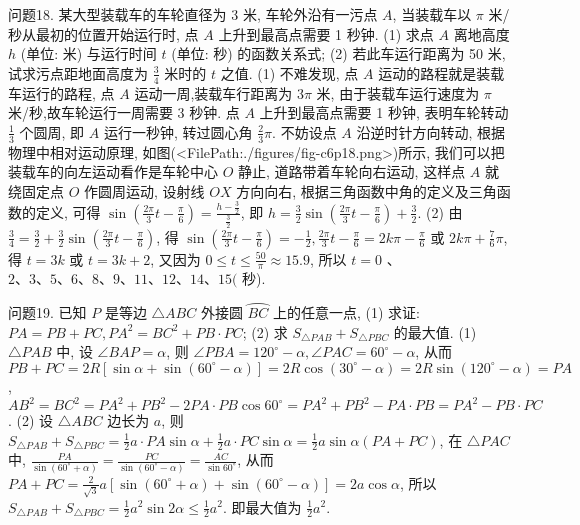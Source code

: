 问题18. 某大型装载车的车轮直径为 3 米, 车轮外沿有一污点 $A$, 当装载车以 $\pi$ 米/秒从最初的位置开始运行时, 点 $A$ 上升到最高点需要 1 秒钟.
(1) 求点 $A$ 离地高度 $h$ (单位: 米) 与运行时间 $t$ (单位: 秒) 的函数关系式; (2) 若此车运行距离为 50 米, 试求污点距地面高度为 $\frac{3}{4}$ 米时的 $t$ 之值.
(1) 不难发现, 点 $A$ 运动的路程就是装载车运行的路程, 点 $A$ 运动一周,装载车行距离为 $3 \pi$ 米, 由于装载车运行速度为 $\pi$ 米/秒,故车轮运行一周需要 3 秒钟.
点 $A$ 上升到最高点需要 1 秒钟, 表明车轮转动 $\frac{1}{3}$ 个圆周, 即 $A$ 运行一秒钟, 转过圆心角 $\frac{2}{3} \pi$. 不妨设点 $A$ 沿逆时针方向转动, 根据物理中相对运动原理, 如图(<FilePath:./figures/fig-c6p18.png>)所示, 我们可以把装载车的向左运动看作是车轮中心 $O$ 静止, 道路带着车轮向右运动, 这样点 $A$ 就绕固定点 $O$ 作圆周运动, 设射线 $O X$ 方向向右, 根据三角函数中角的定义及三角函数的定义, 可得 $\sin \left(\frac{2 \pi}{3} t-\frac{\pi}{6}\right)=\frac{h-\frac{3}{2}}{\frac{3}{2}}$, 即 $h=\frac{3}{2} \sin \left(\frac{2 \pi}{3} t-\frac{\pi}{6}\right)+\frac{3}{2}$.
(2) 由 $\frac{3}{4}=\frac{3}{2}+\frac{3}{2} \sin \left(\frac{2 \pi}{3} t-\frac{\pi}{6}\right)$, 得 $\sin \left(\frac{2 \pi}{3} t-\frac{\pi}{6}\right)=-\frac{1}{2}, \frac{2 \pi}{3} t-\frac{\pi}{6}=2 k \pi- \frac{\pi}{6}$ 或 $2 k \pi+\frac{7}{6} \pi$, 得 $t=3 k$ 或 $t=3 k+2$, 又因为 $0 \leqslant t \leqslant \frac{50}{\pi} \approx 15.9$, 所以 $t=0$ 、 $2 、 3 、 5 、 6 、 8 、 9 、 11 、 12 、 14 、 15($ 秒).



问题19. 已知 $P$ 是等边 $\triangle A B C$ 外接圆 $\overparen{B C}$ 上的任意一点,
(1) 求证: $P A=P B+P C, P A^2=B C^2+P B \cdot P C$;
(2) 求 $S_{\triangle P A B}+S_{\triangle P B C}$ 的最大值.
(1) $\triangle P A B$ 中, 设 $\angle B A P=\alpha$, 则 $\angle P B A= 120^{\circ}-\alpha, \angle P A C=60^{\circ}-\alpha$, 从而 $P B+P C=2 R\left[\sin \alpha+ \sin \left(60^{\circ}-\alpha\right)\right]=2 R \cos \left(30^{\circ}-\alpha\right)=2 R \sin \left(120^{\circ}-\alpha\right)=P A$, $A B^2=B C^2=P A^2+P B^2-2 P A \cdot P B \cos 60^{\circ}=P A^2+ P B^2-P A \cdot P B=P A^2-P B \cdot P C$. 
(2) 设 $\triangle A B C$ 边长为 $a$, 则 $S_{\triangle P A B}+S_{\triangle P B C}=\frac{1}{2} a \cdot P A \sin \alpha+\frac{1}{2} a \cdot P C \sin \alpha= \frac{1}{2} a \sin \alpha(P A+P C)$, 在 $\triangle P A C$ 中, $\frac{P A}{\sin \left(60^{\circ}+\alpha\right)}=\frac{P C}{\sin \left(60^{\circ}-\alpha\right)}=\frac{A C}{\sin 60^{\circ}}$, 从而 $P A+P C=\frac{2}{\sqrt{3}} a\left[\sin \left(60^{\circ}+\alpha\right)+\sin \left(60^{\circ}-\alpha\right)\right]= 2 a \cos \alpha$, 所以 $S_{\triangle P A B}+S_{\triangle P B C}=\frac{1}{2} a^2 \sin 2 \alpha \leqslant \frac{1}{2} a^2$. 即最大值为 $\frac{1}{2} a^2$.



